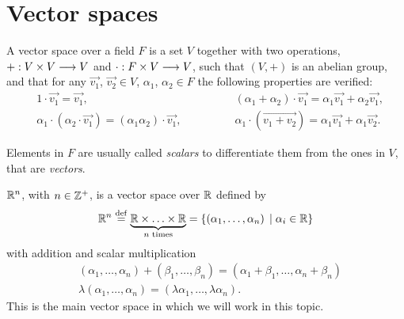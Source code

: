 \chapter{Vector spaces}
\thispagestyle{noheaders}

\begin{defi}
    A vector space over a field $F$ is a set $V$ together with two operations, $+ : V\times V\longrightarrow V$
    and $\cdot : F\times V\longrightarrow V$, such that $\left( V, + \right) $ is an abelian group, and that for any
    $\vec{v_1}$, $\vec{v_2}\in V$, $\alpha_1$, $\alpha_2\in F$ the following properties are verified:
    \begin{align*}
        & 1\cdot \vec{v_1} = \vec{v_1}, \quad\quad\quad\quad & \left( \alpha_1 + \alpha_2 \right) \cdot \vec{v_1} = \alpha_1\vec{v_1} + \alpha_2\vec{v_1}, \\
        & \alpha_1\cdot\left( \alpha_2\cdot \vec{v_1} \right) = \left( \alpha_1\alpha_2 \right) \cdot
        \vec{v_1}, \quad\quad\quad\quad &  \alpha_1\cdot\left( \vec{v_1 + v_2} \right) = \alpha_1\vec{v_1} + \alpha_1\vec{v_2}.
    \end{align*}

\end{defi}

\begin{notation}
Elements in $F$ are usually called \textit{scalars} to differentiate them from the ones in $V$, that are
\textit{vectors}.
\end{notation}

\begin{example}
    $\mathbb{R}^n$, with $n\in\mathbb{Z}^+$, is a vector space over $\mathbb{R}$ defined by
    \begin{equation}
        \mathbb{R}^n\overset{\mathrm{def}}{=} \underbrace{\mathbb{R}\times\ldots\times\mathbb{R}}_{n \textrm{ times}} = \{\left( \alpha_1, \ldots,
    \alpha_n \right)\; | \; \alpha_i\in\mathbb{R}\}
    \end{equation}
    with addition and scalar multiplication
    \begin{align}
        &\left( \alpha_1, \ldots, \alpha_n \right) + \left( \beta_1, \ldots, \beta_n \right) = \left( \alpha_1          + \beta_1, \ldots, \alpha_n + \beta_n\right) \\
        &\lambda\left( \alpha_1, \ldots, \alpha_n \right) = \left( \lambda\alpha_1, \ldots, \lambda\alpha_n
        \right).
    \end{align}
    This is the main vector space in which we will work in this topic.
\end{example}

